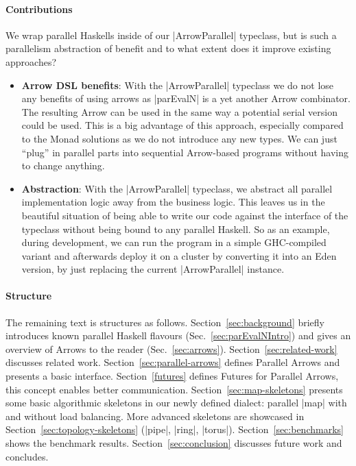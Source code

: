 \paragraph{Contributions}
%
%
We wrap parallel Haskells inside of our |ArrowParallel| typeclass, but
 is such a parallelism abstraction of benefit and to what extent does
 it improve existing approaches?
\begin{itemize}
	\item \textbf{Arrow DSL benefits}:
	With the |ArrowParallel| typeclass we do not lose any benefits of using arrows as |parEvalN| is a yet another Arrow combinator. The resulting Arrow can be used in the same way a potential serial version could be used. This is a big advantage of this approach, especially compared to the Monad solutions as we do not introduce any new types. We can just \enquote{plug} in parallel parts into sequential Arrow-based programs without having to change anything.
	\item \textbf{Abstraction}:
	With the |ArrowParallel| typeclass, we abstract all parallel implementation logic away from the business logic. This leaves us in the beautiful situation of being able to write our code against the interface of the typeclass without being bound to any parallel Haskell. So as an example, during development, we can run the program in a simple GHC-compiled variant and afterwards deploy it on a cluster by converting it into an Eden version, by just replacing the current |ArrowParallel| instance.
\end{itemize}


\paragraph{Structure}
The remaining text is structures as follows. Section~\ref{sec:background} briefly introduces known parallel Haskell flavours (Sec.~\ref{sec:parEvalNIntro}) and gives an overview of Arrows to the reader (Sec.~\ref{sec:arrows}). Section~\ref{sec:related-work} discusses related work. Section~\ref{sec:parallel-arrows} defines Parallel Arrows and presents a basic interface. Section~\ref{futures} defines Futures for Parallel Arrows, this concept enables better communication. Section~\ref{sec:map-skeletons} presents some basic algorithmic skeletons  in our newly defined dialect: parallel |map| with and without load balancing. More advanced skeletons are showcased in Section~\ref{sec:topology-skeletons} (|pipe|, |ring|, |torus|). Section~\ref{sec:benchmarks} shows the benchmark results. Section~\ref{sec:conclusion} discusses future work and concludes.

